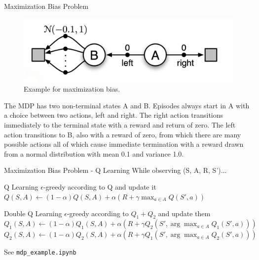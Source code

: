 \documentclass{beamer}
\begin{document}
\begin{frame}{Maximization Bias Problem}
\begin{figure}[htpb]
    \centering
    \includegraphics[width=0.7\linewidth]{pic/max_bias.png}
    \caption{Example for maximization bias.}
\end{figure}
The MDP has two non-terminal states A and B. Episodes always start in A with a choice between two actions, left and right. The right action transitions immediately to the terminal state with a reward and return of zero. The left action transitions to B, also with a reward of zero, from which there are many possible actions all of which cause immediate termination with a reward drawn from a normal distribution with mean 0.1 and variance 1.0.
\end{frame}


\begin{frame}{Maximization Bias Problem - Q Learning}
While observing (S, A, R, S')... 
\begin{exampleblock}{Q Learning}
$\epsilon$-greedy according to Q and update it\\
$
Q(S,A)
\gets (1-\alpha)Q(S,A)
+ \alpha(R + \gamma \max_{a\in A}Q(S',a)) 
$
\end{exampleblock}

\begin{exampleblock}{Double Q Learning}
$\epsilon$-greedy according to $Q_1+Q_2$ and update them\\
$
Q_1(S,A)
\gets (1-\alpha)Q_1(S,A)
+ \alpha(R + \gamma Q_2(S', \arg\max_{a\in A} Q_1(S',a)))
$
$
Q_2(S,A)
\gets (1-\alpha)Q_2(S,A)
+ \alpha(R + \gamma Q_1(S', \arg\max_{a\in A} Q_2(S',a)))
$
\end{exampleblock}

See \texttt{mdp\_example.ipynb}
\end{frame}
\end{document}
